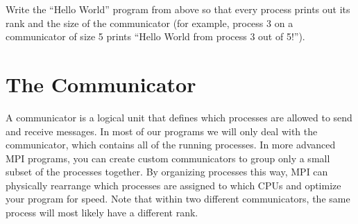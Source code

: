 \begin{problem}
Write the ``Hello World'' program from above so that every process prints out its rank and the size of the communicator (for example, process 3 on a communicator of size 5 prints ``Hello World from process 3 out of 5!'').
\end{problem}


\section*{The Communicator}
A communicator is a logical unit that defines which processes are allowed to send and receive messages. In most of our programs we will only deal with the  communicator, which contains all of the running processes. In more advanced MPI programs, you can create custom communicators to group only a small subset of the processes together. By organizing processes this way, MPI can physically rearrange which processes are assigned to which CPUs and optimize your program for speed. Note that within two different communicators, the same process will most likely have a different rank.






